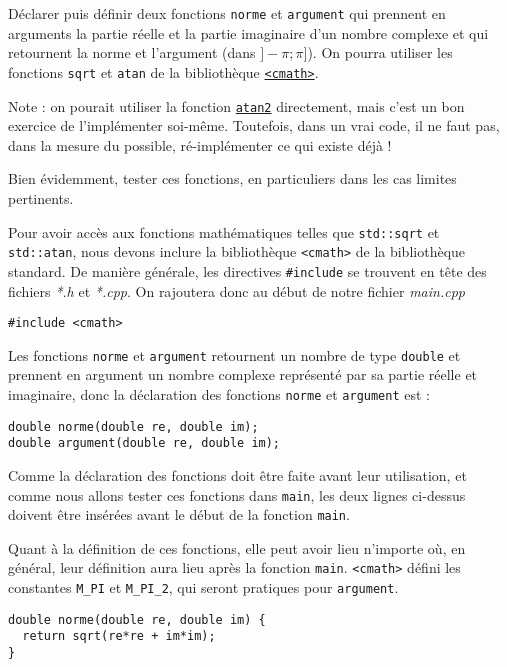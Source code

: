 \documentclass{book}
\newcommand{\inline}[1]{\texttt{#1}}
\def\filename{\emph}
\begin{document}
Déclarer puis définir deux fonctions \inline{norme} et \inline{argument} qui prennent en arguments la partie réelle et la partie imaginaire d'un nombre complexe et qui retournent la norme et l'argument (dans $]-\pi;\pi]$). On pourra utiliser les fonctions \texttt{sqrt} et \texttt{atan} de la bibliothèque \href{http://en.cppreference.com/w/cpp/header/cmath}{\inline{<cmath>}}.

Note : on pourait utiliser la fonction \href{https://fr.wikipedia.org/wiki/Atan2}{\texttt{atan2}} directement, mais c'est un bon exercice de l'implémenter soi-même. Toutefois, dans un vrai code, il ne faut pas, dans la mesure du possible, ré-implémenter ce qui existe déjà !

Bien évidemment, tester ces fonctions, en particuliers dans les cas limites pertinents.

\begin{correction}
Pour avoir accès aux fonctions mathématiques telles que \inline{std::sqrt} et \inline{std::atan}, nous devons inclure la bibliothèque \inline{<cmath>} de la bibliothèque standard. De manière générale, les directives \texttt{#include} se trouvent en tête des fichiers \filename{*.h} et \filename{*.cpp}. On rajoutera donc au début de notre fichier \filename{main.cpp}
\begin{verbatim}
#include <cmath>
\end{verbatim}
Les fonctions \inline{norme} et \inline{argument} retournent un nombre de type \inline{double} et prennent en argument un nombre complexe représenté par sa  partie réelle et imaginaire, donc la déclaration des fonctions \inline{norme} et \inline{argument} est :
\begin{verbatim}
double norme(double re, double im);
double argument(double re, double im);
\end{verbatim}
Comme la déclaration des fonctions doit être faite avant leur utilisation, et comme nous allons tester ces fonctions dans \inline{main}, les deux lignes ci-dessus doivent être insérées avant le début de la fonction \inline{main}.

Quant à la définition de ces fonctions, elle peut avoir lieu n'importe où, en général, leur définition aura lieu après la fonction \inline{main}. \inline{<cmath>} défini les constantes \inline{M_PI} et \inline{M_PI_2}, qui seront pratiques pour \inline{argument}.
\begin{verbatim}
double norme(double re, double im) {
  return sqrt(re*re + im*im);
}


\end{verbatim}
\end{correction}
\end{document}
